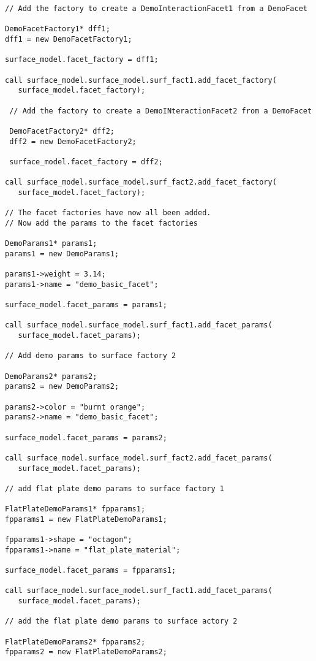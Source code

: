 \begin{description}
\begin{verbatim}
// Add the factory to create a DemoInteractionFacet1 from a DemoFacet

DemoFacetFactory1* dff1;
dff1 = new DemoFacetFactory1;

surface_model.facet_factory = dff1;

call surface_model.surface_model.surf_fact1.add_facet_factory(
   surface_model.facet_factory);

 // Add the factory to create a DemoINteractionFacet2 from a DemoFacet

 DemoFacetFactory2* dff2;
 dff2 = new DemoFacetFactory2;

 surface_model.facet_factory = dff2;

call surface_model.surface_model.surf_fact2.add_facet_factory(
   surface_model.facet_factory);

// The facet factories have now all been added.
// Now add the params to the facet factories

DemoParams1* params1;
params1 = new DemoParams1;

params1->weight = 3.14;
params1->name = "demo_basic_facet";

surface_model.facet_params = params1;

call surface_model.surface_model.surf_fact1.add_facet_params(
   surface_model.facet_params);

// Add demo params to surface factory 2

DemoParams2* params2;
params2 = new DemoParams2;

params2->color = "burnt orange";
params2->name = "demo_basic_facet";

surface_model.facet_params = params2;

call surface_model.surface_model.surf_fact2.add_facet_params(
   surface_model.facet_params);

// add flat plate demo params to surface factory 1

FlatPlateDemoParams1* fpparams1;
fpparams1 = new FlatPlateDemoParams1;

fpparams1->shape = "octagon";
fpparams1->name = "flat_plate_material";

surface_model.facet_params = fpparams1;

call surface_model.surface_model.surf_fact1.add_facet_params(
   surface_model.facet_params);

// add the flat plate demo params to surface actory 2

FlatPlateDemoParams2* fpparams2;
fpparams2 = new FlatPlateDemoParams2;


\end{verbatim}
\end{description}
